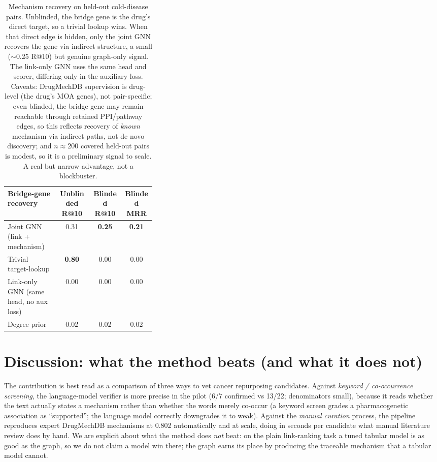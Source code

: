 \documentclass[11pt]{article}
\begin{document}
\begin{table}[H]
\centering\small
\begin{tabular}{>{\raggedright\arraybackslash}p{0.34\linewidth} cc c}
\toprule
\rowcolor{sriblue}\color{white}\textbf{Bridge-gene recovery} & \color{white}\textbf{Unblinded R@10} & \color{white}\textbf{Blinded R@10} & \color{white}\textbf{Blinded MRR}\\
\midrule
\rowcolor{srirow} Joint GNN (link + mechanism) & 0.31 & \textbf{0.25} & \textbf{0.21}\\
Trivial target-lookup & \textbf{0.80} & 0.00 & 0.00\\
\rowcolor{srirow} Link-only GNN (same head, no aux loss) & 0.00 & 0.00 & 0.00\\
Degree prior & 0.02 & 0.02 & 0.02\\
\bottomrule
\end{tabular}
\caption{Mechanism recovery on held-out cold-disease pairs. Unblinded, the bridge
gene is the drug's direct target, so a trivial lookup wins. When that direct edge
is hidden, only the joint GNN recovers the gene via indirect structure, a small
($\sim$0.25 R@10) but genuine graph-only signal. The link-only GNN uses the same
head and scorer, differing only in the auxiliary loss. Caveats: DrugMechDB supervision
is drug-level (the drug's MOA genes), not pair-specific; even blinded, the bridge gene
may remain reachable through retained PPI/pathway edges, so this reflects recovery of
\emph{known} mechanism via indirect paths, not de novo discovery; and $n\approx200$
covered held-out pairs is modest, so it is a preliminary signal to scale. A real but
narrow advantage, not a blockbuster.}
\label{tab:mechrec}
\end{table}

\section{Discussion: what the method beats (and what it does not)}

The contribution is best read as a comparison of three ways to vet cancer
repurposing candidates. Against \emph{keyword / co-occurrence screening}, the
language-model verifier is more precise in the pilot (6/7 confirmed vs 13/22;
denominators small), because it reads whether the text actually states a mechanism
rather than whether the words merely
co-occur (a keyword screen grades a pharmacogenetic association as ``supported'';
the language model correctly downgrades it to weak). Against the \emph{manual
curation} process, the pipeline reproduces expert DrugMechDB mechanisms at 0.802
automatically and at scale, doing in seconds per candidate what manual literature
review does by hand. We are explicit about what the method does \emph{not} beat: on
the plain link-ranking task a tuned tabular model is as good as the graph, so we do
not claim a model win there; the graph earns its place by producing the traceable
mechanism that a tabular model cannot.
\end{document}
